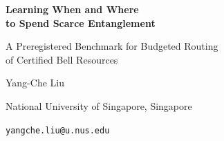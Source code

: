 \documentclass[11pt,a4paper]{article}
\begin{document}
\begin{titlepage}
\begin{center}
{\LARGE\bfseries Learning When and Where\\[3pt] to Spend Scarce Entanglement\par}
\vspace{4mm}
{\Large A Preregistered Benchmark for Budgeted Routing\\[3pt] of Certified Bell Resources\par}
\vspace{10mm}
{\large Yang-Che Liu\par}
\vspace{2mm}
{National University of Singapore, Singapore\par}
{\small\texttt{yangche.liu@u.nus.edu}\par}
\vspace{8mm}
\end{center}


\end{titlepage}
\end{document}
